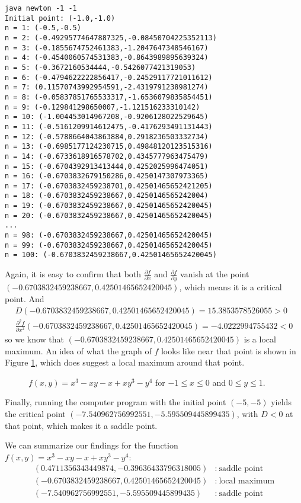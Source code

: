 \begin{exmp}
\begin{verbatim}
java newton -1 -1
Initial point: (-1.0,-1.0)
n = 1: (-0.5,-0.5)
n = 2: (-0.49295774647887325,-0.08450704225352113)
n = 3: (-0.1855674752461383,-1.2047647348546167)
n = 4: (-0.4540060574531383,-0.8643989895639324)
n = 5: (-0.3672160534444,-0.5426077421319053)
n = 6: (-0.4794622222856417,-0.24529117721011612)
n = 7: (0.11570743992954591,-2.4319791238981274)
n = 8: (-0.05837851765533317,-1.6536079835854451)
n = 9: (-0.129841298650007,-1.121516233310142)
n = 10: (-1.004453014967208,-0.9206128022529645)
n = 11: (-0.5161209914612475,-0.4176293491131443)
n = 12: (-0.5788664043863884,0.2918236503332734)
n = 13: (-0.6985177124230715,0.49848120123515316)
n = 14: (-0.6733618916578702,0.4345777963475479)
n = 15: (-0.6704392913413444,0.4252025996474051)
n = 16: (-0.6703832679150286,0.4250147307973365)
n = 17: (-0.6703832459238701,0.42501465652421205)
n = 18: (-0.6703832459238667,0.4250146565242004)
n = 19: (-0.6703832459238667,0.42501465652420045)
n = 20: (-0.6703832459238667,0.42501465652420045)
...
n = 98: (-0.6703832459238667,0.42501465652420045)
n = 99: (-0.6703832459238667,0.42501465652420045)
n = 100: (-0.6703832459238667,0.42501465652420045)
\end{verbatim}

Again, it is easy to confirm that both $\frac{\partial f}{\partial x}$ and $\frac{\partial f}{\partial y}$ vanish
at the point\\$(-0.6703832459238667,0.42501465652420045)$, which means it is a critical point. 
And
\begin{gather*}
 D(-0.6703832459238667,0.42501465652420045) = 15.3853578526055 > 0\\
 \frac{\partial^2 f}{\partial x^2}(-0.6703832459238667,0.42501465652420045) = -4.0222994755432 < 0
\end{gather*}
so we know that $(-0.6703832459238667,0.42501465652420045)$ is a local maximum. An idea of what the graph of $f$ looks
like near that point is shown in Figure \ref{fig:newtonmax}, which does suggest a local maximum around that point.

\begin{figure}[h]
 \begin{center}
  
 \end{center}\vspace{-9mm}
 \caption[]{\quad $f(x,y) = x^3 - xy - x + xy^3 - y^4$ for $-1 \le x \le 0$ and $0 \le y \le 1$.}
 \label{fig:newtonmax}
\end{figure}

Finally, running the computer program with the initial point $(-5,-5)$ yields the critical point
$(-7.540962756992551,-5.595509445899435)$, with $D < 0$ at that point, which makes it a saddle point.

We can summarize our findings for the function $f(x,y) = x^3 - xy - x + xy^3 - y^4$:
\begin{align*}
 (0.4711356343449874,-0.39636433796318005)&:~ \text{saddle point}\\
 (-0.6703832459238667,0.42501465652420045)&:~ \text{local maximum}\\
 (-7.540962756992551,-5.595509445899435)&:~ \text{saddle point}
\end{align*}
\end{exmp}
